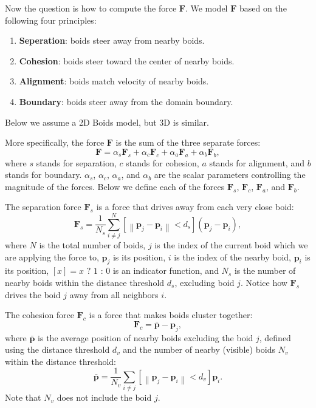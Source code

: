 Now the question is how to compute the force $\mathbf{F}$. We model $\mathbf{F}$ based on the following four principles:
\begin{enumerate}
	\item \textbf{Seperation}: boids steer away from nearby boids.
	\item \textbf{Cohesion}: boids steer toward the center of nearby boids.
	\item \textbf{Alignment}: boids match velocity of nearby boids.
	\item \textbf{Boundary}: boids steer away from the domain boundary.
\end{enumerate}
Below we assume a 2D Boids model, but 3D is similar.

More specifically, the force $\mathbf{F}$ is the sum of the three separate forces:
\begin{equation}
\mathbf{F} = \alpha_s \mathbf{F}_s + \alpha_c \mathbf{F}_c + \alpha_a \mathbf{F}_a + \alpha_b \mathbf{F}_b,
\end{equation}
where $s$ stands for separation, $c$ stands for cohesion, $a$ stands for alignment, and $b$ stands for boundary. $\alpha_s$, $\alpha_c$, $\alpha_a$, and $\alpha_b$ are the scalar parameters controlling the magnitude of the forces. Below we define each of the forces $\mathbf{F}_s$, $\mathbf{F}_c$, $\mathbf{F}_a$, and $\mathbf{F}_b$.

The separation force $\mathbf{F}_s$ is a force that drives away from each very close boid:
\begin{equation}
\mathbf{F}_s = \frac{1}{N_s} \sum_{i \neq j}^N \left[\left\|\mathbf{p}_j - \mathbf{p}_i\right\| < d_s\right] \left(\mathbf{p}_j - \mathbf{p}_i\right),
\end{equation}
where $N$ is the total number of boids, $j$ is the index of the current boid which we are applying the force to, $\mathbf{p}_j$ is its position, $i$ is the index of the nearby boid, $\mathbf{p}_i$ is its position, $[x] = x \text{ ? } 1 \text{ : } 0$ is an indicator function, and $N_s$ is the number of nearby boids within the distance threshold $d_s$, excluding boid $j$. Notice how $\mathbf{F}_s$ drives the boid $j$ away from all neighbors $i$.

The cohesion force $\mathbf{F}_c$ is a force that makes boids cluster together:
\begin{equation}
\mathbf{F}_c = \bar{\mathbf{p}} - \mathbf{p}_j,
\end{equation}
where $\bar{\mathbf{p}}$ is the average position of nearby boids excluding the boid $j$, defined using the distance threshold $d_v$ and the number of nearby (visible) boids $N_v$ within the distance threshold:
\begin{equation}
\bar{\mathbf{p}} = \frac{1}{N_v} \sum_{i \neq j} \left[\left\|\mathbf{p}_j - \mathbf{p}_i\right\| < d_v\right] \mathbf{p}_i.
\end{equation}
Note that $N_v$ does not include the boid $j$.


